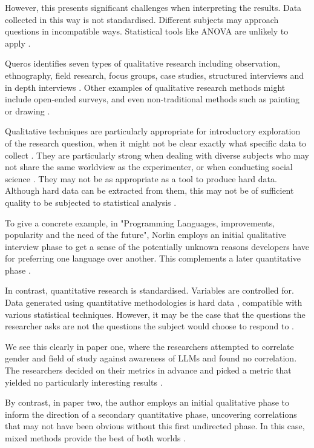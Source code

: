 \documentclass[12pt]{article}
\begin{document}
However, this presents significant challenges when interpreting the results. Data collected in this way is not standardised. Different subjects may approach questions in incompatible ways. Statistical tools like ANOVA are unlikely to apply \cite{merriam}.

Queros identifies seven types of qualitative research including observation, ethnography, field research, focus groups, case studies, structured interviews and in depth interviews \cite{queros}. Other examples of qualitative research methods might include open-ended surveys, and even non-traditional methods such as painting or drawing \cite{merriam}.

Qualitative techniques are particularly appropriate for introductory exploration of the research question, when it might not be clear exactly what specific data to collect \cite{merriam}. They are particularly strong when dealing with diverse subjects who may not share the same worldview as the experimenter, or when conducting social science \cite{mertens}. They may not be as appropriate as a tool to produce hard data. Although hard data can be extracted from them, this may not be of sufficient quality to be subjected to statistical analysis \cite{allwood}.

To give a concrete example, in "Programming Languages, improvements, popularity and the need of the future", Norlin employs an initial qualitative interview phase to get a sense of the potentially unknown reasons developers have for preferring one language over another. This complements a later quantitative phase \cite{norlins}.

In contrast, quantitative research is standardised. Variables are controlled for. Data generated using quantitative methodologies is hard data \cite{allwood}, compatible with various statistical techniques. However, it may be the case that the questions the researcher asks are not the questions the subject would choose to respond to \cite{mertens}. 

We see this clearly in paper one, where the researchers attempted to correlate gender and field of study against awareness of LLMs and found no correlation. The researchers decided on their metrics in advance and picked a metric that yielded no particularly interesting results \cite{paper1}.

By contrast, in paper two, the author employs an initial qualitative phase to inform the direction of a secondary quantitative phase, uncovering correlations that may not have been obvious without this first undirected phase. In this case, mixed methods provide the best of both worlds \cite{paper2}.
\end{document}
